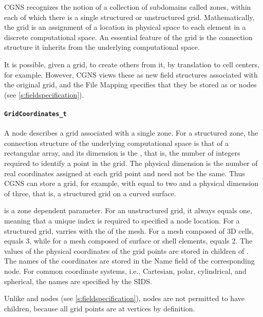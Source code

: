 CGNS recognizes the notion of a collection of subdomains called zones,
within each of which there is a single structured or unstructured
grid. Mathematically, the grid is an assignment of a location in
physical space to each element in a discrete computational space. An
essential feature of the grid is the connection structure it inherits
from the underlying computational space.

It is possible, given a grid, to create others from it, by translation
to cell centers, for example. However, CGNS views these as new
field structures associated with the original grid, and the File
Mapping specifies that they be stored as  or
 nodes (see \autoref{s:fieldspecification}).

\paragraph{\texttt{GridCoordinates\_t}}

A  node describes a grid associated with
a single zone. For a structured zone, the connection structure of
the underlying computational space is that of a rectangular array,
and its dimension is the , that is, the number
of integers required to identify a point in the grid. The physical
dimension is the number of real coordinates assigned at each grid point
and need not be the same. Thus CGNS can store a grid, for example, with
 equal to two and a physical dimension of three,
that is, a structured grid on a curved surface.

 is a zone dependent parameter. For an unstructured
grid, it always equals one, meaning that a unique index is required to
specified a node location. For a structured grid, 
varries with the  of the mesh. For a mesh composed
of 3D cells,  equals 3, while for a mesh composed
of surface or shell elements,  equals 2. The
values of the physical coordinates of the grid points are stored
in  children of . The
names of the coordinates are stored in the Name field of the
corresponding  node. For common coordinate systems,
i.e., Cartesian, polar, cylindrical, and spherical, the names are
specified by the SIDS.

Unlike  and  nodes (see
\autoref{s:fieldspecification}),  nodes are
not permitted to have  children, because all grid
points are at vertices by definition.

